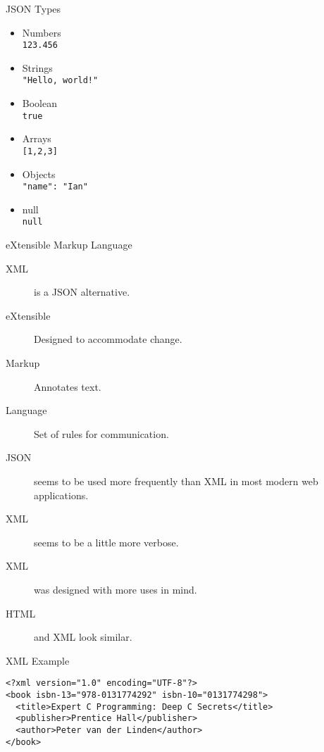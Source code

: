 \begin{frame}{JSON Types}
  \begin{itemize}
    \item Numbers \\
    \hspace{0.5cm} \texttt{123.456}
    \item Strings \\
    \hspace{0.5cm} \texttt{"Hello, world!"}
    \item Boolean \\
    \hspace{0.5cm} \texttt{true}
    \item Arrays\\
    \hspace{0.5cm} \texttt{[1,2,3]}
    \item Objects\\
    \hspace{0.5cm} \texttt{{"name": "Ian"}}
    \item null \\
    \hspace{0.5cm} \texttt{null}
  \end{itemize}
\end{frame}



\begin{frame}{eXtensible Markup Language}
  \begin{description}
    \item[XML] is a JSON alternative. 
    \item[eXtensible] Designed to accommodate change.
    \item[Markup] Annotates text.
    \item[Language] Set of rules for communication.
    \item[JSON] seems to be used more frequently than XML in most modern web applications.
    \item[XML] seems to be a little more verbose.
    \item[XML] was designed with more uses in mind.
    \item[HTML] and XML look similar.
  \end{description}
\end{frame}

\begin{frame}[fragile]{XML Example}
  \begin{verbatim}
<?xml version="1.0" encoding="UTF-8"?>
<book isbn-13="978-0131774292" isbn-10="0131774298">
  <title>Expert C Programming: Deep C Secrets</title>
  <publisher>Prentice Hall</publisher>
  <author>Peter van der Linden</author>
</book>
  \end{verbatim}
\end{frame}


